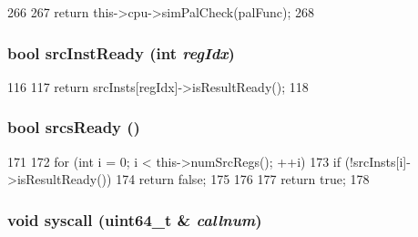\begin{DoxyCode}
266 {
267     return this->cpu->simPalCheck(palFunc);
268 }
\end{DoxyCode}
\hypertarget{classOzoneDynInst_abd9ccfd808ecf42a7a29602c82011672}{
\subsubsection[{srcInstReady}]{\setlength{\rightskip}{0pt plus 5cm}bool srcInstReady (int {\em regIdx})}}
\label{classOzoneDynInst_abd9ccfd808ecf42a7a29602c82011672}



\begin{DoxyCode}
116 {
117     return srcInsts[regIdx]->isResultReady();
118 }
\end{DoxyCode}
\hypertarget{classOzoneDynInst_a711a83b62e4c8eb42995611093434528}{
\subsubsection[{srcsReady}]{\setlength{\rightskip}{0pt plus 5cm}bool srcsReady ()}}
\label{classOzoneDynInst_a711a83b62e4c8eb42995611093434528}



\begin{DoxyCode}
171 {
172     for (int i = 0; i < this->numSrcRegs(); ++i) {
173         if (!srcInsts[i]->isResultReady())
174             return false;
175     }
176 
177     return true;
178 }
\end{DoxyCode}
\hypertarget{classOzoneDynInst_afb9b1cbbf52b94f9a2da780a3cc4586b}{
\subsubsection[{syscall}]{\setlength{\rightskip}{0pt plus 5cm}void syscall (uint64\_\-t \& {\em callnum})}}
\label{classOzoneDynInst_afb9b1cbbf52b94f9a2da780a3cc4586b}



